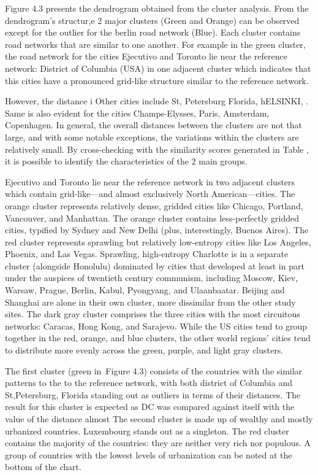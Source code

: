 Figure 4.3 presents the dendrogram obtained from the cluster analysis. From the dendrogram's structur,e 2 major clusters (Green and Orange) can be observed except for the outlier for the berlin road network (Blue). Each cluster contains road networks that are similar to one another. For example in the green cluster, the road network for the cities Ejecutivo and Toronto lie near the reference network: District of Columbia (USA) in one adjacent cluster which indicates that this cities have a pronounced grid-like structure similar to the reference network. 

However, the distance i Other cities include St, Petersburg Florida, hELSINKI, . Same is also evident for the cities Champs-Elysses, Paris, Amsterdam, Copenhagen.  In general, the overall distances between the clusters are not that large, and with some notable exceptions, the variations within the clusters are relatively small. By cross-checking with the similarity scores generated in Table , it is possible to identify the characteristics of the 2 main groups. 

Ejecutivo and Toronto lie near the reference network in two adjacent clusters which contain grid-like—and almost exclusively North American—cities. The orange cluster represents relatively dense, gridded cities like Chicago, Portland, Vancouver, and Manhattan. The orange cluster contains less-perfectly gridded cities, typified by Sydney and New Delhi (plus, interestingly, Buenos Aires). The red cluster represents sprawling but relatively low-entropy cities like Los Angeles, Phoenix, and Las Vegas. Sprawling, high-entropy Charlotte is in a separate cluster (alongside Honolulu) dominated by cities that developed at least in part under the auspices of twentieth century communism, including Moscow, Kiev, Warsaw, Prague, Berlin, Kabul, Pyongyang, and Ulaanbaatar. Beijing and Shanghai are alone in their own cluster, more dissimilar from the other study sites. The dark gray cluster comprises the three cities with the most circuitous networks: Caracas, Hong Kong, and Sarajevo. While the US cities tend to group together in the red, orange, and blue clusters, the other world regions’ cities tend to distribute more evenly across the green, purple, and light gray clusters.

The first cluster (green in Figure 4.3) consists of the countries with the similar patterns to the to the reference network, with both district of Columbia and St,Petersburg, Florida standing out as outliers in terms of their distances. The result for this cluster is expected as DC was compared against itself with the value of the distance almost 
The second cluster is made up of wealthy and mostly urbanized countries. Luxembourg stands out as a singleton.
The red cluster contains the majority of the countries: they are neither very rich nor populous. A group of countries with the lowest levels of urbanization can be noted at the bottom of the chart.

